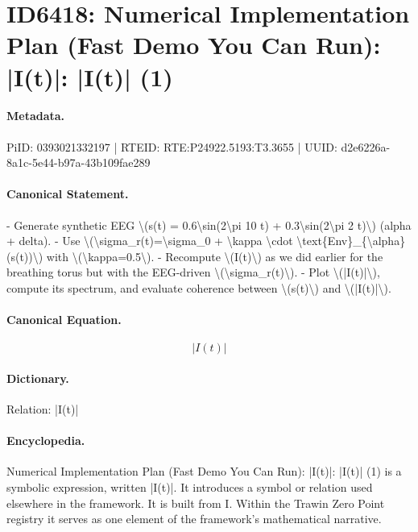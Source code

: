 \section*{ID6418: Numerical Implementation Plan (Fast Demo You Can Run): |I(t)|: |I(t)| (1)}
\paragraph{Metadata.}
PiID: 0393021332197 | RTEID: RTE:P24922.5193:T3.3655 | UUID: d2e6226a-8a1c-5e44-b97a-43b109fae289

\paragraph{Canonical Statement.}
- Generate synthetic EEG \textbackslash{}(s(t) = 0.6\textbackslash{}sin(2\textbackslash{}pi 10 t) + 0.3\textbackslash{}sin(2\textbackslash{}pi 2 t)\textbackslash{}) (alpha + delta). - Use \textbackslash{}(\textbackslash{}sigma\_r(t)=\textbackslash{}sigma\_0 + \textbackslash{}kappa \textbackslash{}cdot \textbackslash{}text\{Env\}\_\{\textbackslash{}alpha\}(s(t))\textbackslash{}) with \textbackslash{}(\textbackslash{}kappa=0.5\textbackslash{}). - Recompute \textbackslash{}(I(t)\textbackslash{}) as we did earlier for the breathing torus but with the EEG-driven \textbackslash{}(\textbackslash{}sigma\_r(t)\textbackslash{}). - Plot \textbackslash{}(|I(t)|\textbackslash{}), compute its spectrum, and evaluate coherence between \textbackslash{}(s(t)\textbackslash{}) and \textbackslash{}(|I(t)|\textbackslash{}).

\paragraph{Canonical Equation.}
\[
|I(t)|
\]

\paragraph{Dictionary.}
Relation: |I(t)|

\paragraph{Encyclopedia.}
Numerical Implementation Plan (Fast Demo You Can Run): |I(t)|: |I(t)| (1) is a symbolic expression, written |I(t)|. It introduces a symbol or relation used elsewhere in the framework. It is built from I. Within the Trawin Zero Point registry it serves as one element of the framework's mathematical narrative.

